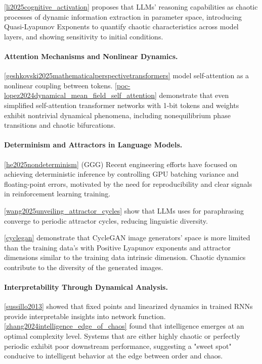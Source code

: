 \documentclass[a4paper,12pt]{article}
\begin{document}
\ref{li2025cognitive_activation} proposes that LLMs' reasoning capabilities as chaotic processes of dynamic information extraction in parameter space, introducing Quasi-Lyapunov Exponents to quantify chaotic characteristics across model layers, and showing sensitivity to initial conditions.

\paragraph{Attention Mechanisms and Nonlinear Dynamics.}
\ref{geshkovski2025mathematicalperspectivetransformers} model self-attention as a nonlinear coupling between tokens.
\ref{poc-lopez2024dynamical_mean_field_self_attention} demonstrate that even simplified self-attention transformer networks with 1-bit tokens and weights exhibit nontrivial dynamical phenomena, including nonequilibrium phase transitions and chaotic bifurcations. 

\paragraph{Determinism and Attractors in Language Models.}
\ref{he2025nondeterminism} (GGG)
Recent engineering efforts have focused on achieving deterministic inference by controlling GPU batching variance and floating-point errors, motivated by the need for reproducibility and clear signals in reinforcement learning training. 

\ref{wang2025unveiling_attractor_cycles} show that LLMs uses for paraphrasing converge to periodic attractor cycles, reducing linguistic diversity.

\ref{cyclegan} %
demonstrate that CycleGAN image generators' space is more limited than the training data's with Positive Lyapunov exponents and attractor dimensions similar to the training data intrinsic dimension. Chaotic dynamics contribute to the diversity of the generated images.

\paragraph{Interpretability Through Dynamical Analysis.}
\ref{sussillo2013} showed that fixed points and linearized dynamics in trained RNNs provide interpretable insights into network function. \ref{zhang2024intelligence_edge_of_chaos} found that intelligence emerges at an optimal complexity level. Systems that are either highly chaotic or perfectly periodic exhibit poor downstream performance, suggesting a "sweet spot" conducive to intelligent behavior at the edge between order and chaos.
\end{document}
